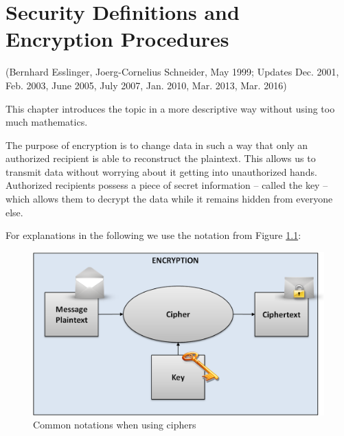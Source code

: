 %
%

\hypertarget{Kapitel_1}{}
\chapter{Security Definitions and Encryption Procedures}
\label{Label_Kapitel_1}
(Bernhard Esslinger, Joerg-Cornelius Schneider, May 1999; Updates Dec. 2001, Feb. 2003, June 2005, July 2007, Jan. 2010, Mar. 2013, Mar. 2016)

This chapter introduces the topic in a more descriptive way without using too much mathematics.

The purpose of encryption  is to change data in such a way
that only an authorized recipient is able to reconstruct the plaintext. This
allows us to transmit data without worrying about it getting into unauthorized
hands. Authorized recipients possess a piece of secret information -- called the
key -- which allows them to decrypt the data while it remains hidden from
everyone else.%

For explanations in the following we use the notation from 
Figure \ref{Generic-Notations-when-Encrypting}:
\begin{figure}[ht]
\begin{center}
\includegraphics[scale=0.7]{figures/Generic-Notation-Encryption_en.png}
\caption{Common notations when using ciphers} 
\label{Generic-Notations-when-Encrypting}
\end{center}
\end{figure}


